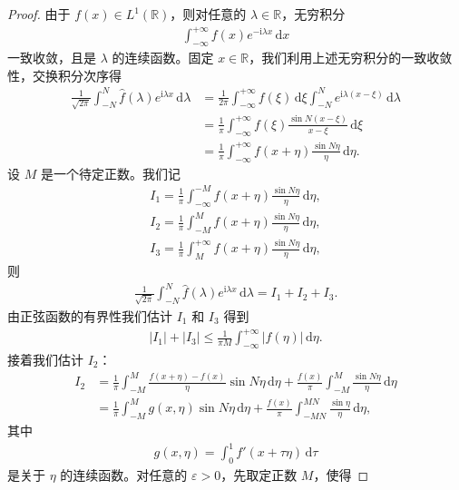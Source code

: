 \documentclass[../../main.tex]{subfiles}%
\begin{document}
\begin{proof}
由于 $f(x)\in L^1(\mathbb{R})$，则对任意的 $\lambda\in\mathbb{R}$，无穷积分
\begin{align*}
\int_{-\infty}^{+\infty}f(x)e^{-\mathrm{i}\lambda  x}\,\mathrm{d}x
\end{align*}
一致收敛，且是 $\lambda$ 的连续函数。固定 $x\in\mathbb{R}$，我们利用上述无穷积分的一致收敛性，交换积分次序得
\begin{align*}
\frac{1}{\sqrt{2\pi}}\int_{-N}^{N}\hat{f}(\lambda)e^{\mathrm{i}\lambda  x}\,\mathrm{d}\lambda
&=\frac{1}{2\pi}\int_{-\infty}^{+\infty}f(\xi)\,\mathrm{d}\xi\int_{-N}^{N}e^{\mathrm{i}\lambda (x-\xi)}\,\mathrm{d}\lambda \\
&=\frac{1}{\pi}\int_{-\infty}^{+\infty}f(\xi)\frac{\sin N(x-\xi)}{x-\xi}\,\mathrm{d}\xi \\
&=\frac{1}{\pi}\int_{-\infty}^{+\infty}f(x+\eta)\frac{\sin N\eta}{\eta}\,\mathrm{d}\eta.
\end{align*}
设 $M$ 是一个待定正数。我们记
\begin{align*}
I_1=\frac{1}{\pi}\int_{-\infty}^{-M}f(x+\eta)\frac{\sin N\eta}{\eta}\,\mathrm{d}\eta,\\
I_2=\frac{1}{\pi}\int_{-M}^{M}f(x+\eta)\frac{\sin N\eta}{\eta}\,\mathrm{d}\eta,\\
I_3=\frac{1}{\pi}\int_{M}^{+\infty}f(x+\eta)\frac{\sin N\eta}{\eta}\,\mathrm{d}\eta,
\end{align*}
则
\begin{align*}
\frac{1}{\sqrt{2\pi}}\int_{-N}^{N}\hat{f}(\lambda)e^{\mathrm{i}\lambda  x}\,\mathrm{d}\lambda=I_1+I_2+I_3.
\end{align*}
由正弦函数的有界性我们估计 $I_1$ 和 $I_3$ 得到
\begin{align*}
|I_1|+|I_3|\leqslant \frac{1}{\pi M}\int_{-\infty}^{+\infty}|f(\eta)|\,\mathrm{d}\eta.
\end{align*}
接着我们估计 $I_2$：
\begin{align*}
I_2&=\frac{1}{\pi}\int_{-M}^{M}\frac{f(x+\eta)-f(x)}{\eta}\sin N\eta\,\mathrm{d}\eta+\frac{f(x)}{\pi}\int_{-M}^{M}\frac{\sin N\eta}{\eta}\,\mathrm{d}\eta \\
&=\frac{1}{\pi}\int_{-M}^{M}g(x,\eta)\sin N\eta\,\mathrm{d}\eta+\frac{f(x)}{\pi}\int_{-MN}^{MN}\frac{\sin\eta}{\eta}\,\mathrm{d}\eta,
\end{align*}
其中
\begin{align*}
g(x,\eta)=\int_0^1 f'(x+\tau\eta)\,\mathrm{d}\tau
\end{align*}
是关于 $\eta$ 的连续函数。对任意的 $\varepsilon>0$，先取定正数 $M$，使得

\end{proof}
\end{document}

